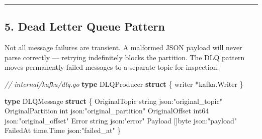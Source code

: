 \documentclass[
]{article}
\newenvironment{Shaded}{}{}
\newcommand{\CommentTok}[1]{\textcolor[rgb]{0.38,0.63,0.69}{\textit{#1}}}
\newcommand{\DataTypeTok}[1]{\textcolor[rgb]{0.56,0.13,0.00}{#1}}
\newcommand{\KeywordTok}[1]{\textcolor[rgb]{0.00,0.44,0.13}{\textbf{#1}}}
\newcommand{\NormalTok}[1]{#1}
\newcommand{\OperatorTok}[1]{\textcolor[rgb]{0.40,0.40,0.40}{#1}}
\newcommand{\StringTok}[1]{\textcolor[rgb]{0.25,0.44,0.63}{#1}}
\begin{document}
\begin{center}\rule{0.5\linewidth}{0.5pt}\end{center}

\hypertarget{dead-letter-queue-pattern}{%
\subsection{5. Dead Letter Queue
Pattern}\label{dead-letter-queue-pattern}}

Not all message failures are transient. A malformed JSON payload will
never parse correctly --- retrying indefinitely blocks the partition.
The DLQ pattern moves permanently-failed messages to a separate topic
for inspection:

\begin{Shaded}
\begin{Highlighting}[]
\CommentTok{// internal/kafka/dlq.go}
\KeywordTok{type}\NormalTok{ DLQProducer }\KeywordTok{struct} \OperatorTok{\{}
\NormalTok{    writer }\OperatorTok{*}\NormalTok{kafka}\OperatorTok{.}\NormalTok{Writer}
\OperatorTok{\}}

\KeywordTok{type}\NormalTok{ DLQMessage }\KeywordTok{struct} \OperatorTok{\{}
\NormalTok{    OriginalTopic     }\DataTypeTok{string}    \StringTok{\textasciigrave{}json:"original\_topic"\textasciigrave{}}
\NormalTok{    OriginalPartition }\DataTypeTok{int}       \StringTok{\textasciigrave{}json:"original\_partition"\textasciigrave{}}
\NormalTok{    OriginalOffset    }\DataTypeTok{int64}     \StringTok{\textasciigrave{}json:"original\_offset"\textasciigrave{}}
\NormalTok{    Error             }\DataTypeTok{string}    \StringTok{\textasciigrave{}json:"error"\textasciigrave{}}
\NormalTok{    Payload           }\OperatorTok{[]}\DataTypeTok{byte}    \StringTok{\textasciigrave{}json:"payload"\textasciigrave{}}
\NormalTok{    FailedAt          time}\OperatorTok{.}\NormalTok{Time }\StringTok{\textasciigrave{}json:"failed\_at"\textasciigrave{}}
\OperatorTok{\}}


\end{Highlighting}
\end{Shaded}
\end{document}
